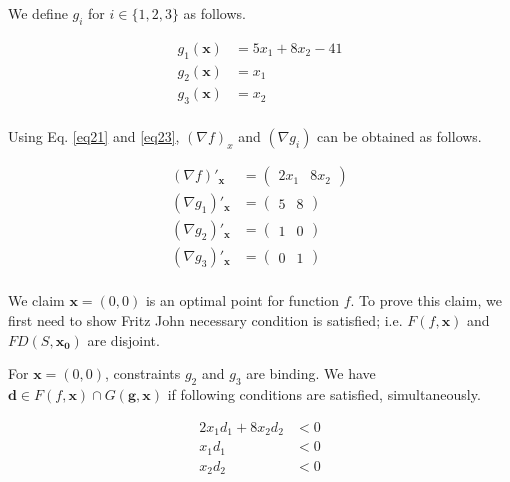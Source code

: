 We define $g_i$ for $i \in \{1,2,3\}$ as follows.

\begin{equation}
\begin{aligned}
g_1(\mathbf{x}) &= 5x_1 + 8x_2 - 41\\
g_2(\mathbf{x}) &= x_1\\
g_3(\mathbf{x}) &= x_2\\
\end{aligned}
\label{eq23}
\end{equation}

Using Eq. \ref{eq21} and \ref{eq23}, $(\nabla f)_x$ and $(\nabla g_i)$ can be obtained as follows.

\begin{equation}
\begin{aligned}
(\nabla f)'_\mathbf{x} &= \begin{pmatrix} 2x_1 & 8x_2\end{pmatrix} \\
(\nabla g_1)'_\mathbf{x} &= \begin{pmatrix} 5 & 8\end{pmatrix} \\
(\nabla g_2)'_\mathbf{x} &= \begin{pmatrix} 1 & 0\end{pmatrix} \\
(\nabla g_3)'_\mathbf{x} &= \begin{pmatrix} 0 & 1\end{pmatrix} \\
\end{aligned}
\label{eq24}
\end{equation}

We claim $\mathbf{x} = (0,0)$ is an optimal point for function $f$.
To prove this claim, we first need to show Fritz John necessary condition is satisfied; i.e. $F(f,\mathbf{x})$ and $FD(S,\mathbf{x_0})$ are disjoint.

For $\mathbf{x} = (0,0)$, constraints $g_2$ and $g_3$ are binding.
We have $\mathbf{d} \in F(f,\mathbf{x}) \cap G(\mathbf{g}, \mathbf{x})$ if following conditions are satisfied, simultaneously.

\begin{equation}
\begin{aligned}
2x_1 d_1 + 8x_2 d_2 &< 0\\
x_1 d_1 &< 0\\
x_2 d_2 &< 0\\
\end{aligned}
\label{eq25}
\end{equation}

